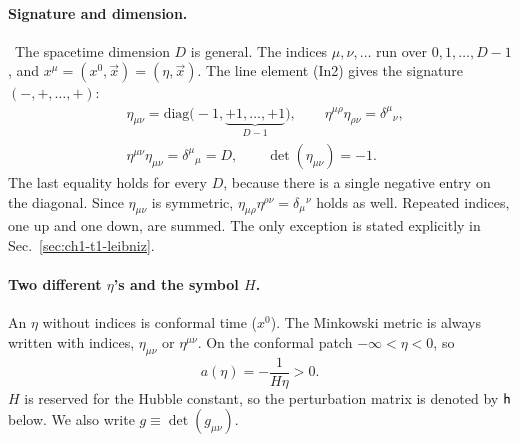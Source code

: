 \paragraph{Signature and dimension.} \tA\ The spacetime dimension $D$ is
general. The indices $\mu,\nu,\ldots$ run over $0,1,\ldots,D-1$, and
$x^\mu=(x^0,\vec x)=(\eta,\vec x)$. The line element (In2) gives the
signature $(-,+,\ldots,+)$:
\begin{equation}
\begin{aligned}
&\eta_{\mu\nu}=\mathrm{diag}\big(-1,\underbrace{+1,\ldots,+1}_{D-1}\big),\qquad
\eta^{\mu\rho}\eta_{\rho\nu}=\delta^\mu{}_\nu,\\
&\eta^{\mu\nu}\eta_{\mu\nu}=\delta^\mu{}_\mu=D,\qquad
\det(\eta_{\mu\nu})=-1 .
\end{aligned}
\label{eq:ch1-eta}
\end{equation}
The last equality holds for every $D$, because there is a single negative entry
on the diagonal. Since $\eta_{\mu\nu}$ is symmetric,
$\eta_{\mu\rho}\eta^{\rho\nu}=\delta_\mu{}^\nu$ holds as well. Repeated indices,
one up and one down, are summed. The only exception is stated explicitly in
Sec.~\ref{sec:ch1-t1-leibniz}.

\paragraph{Two different $\eta$'s and the symbol $H$.} An $\eta$ without
indices is conformal time ($x^0$). The Minkowski metric is always written with
indices, $\eta_{\mu\nu}$ or $\eta^{\mu\nu}$. On the conformal patch
$-\infty<\eta<0$, so
\begin{equation}
a(\eta)=-\frac{1}{H\eta}>0 .
\label{eq:ch1-apos}
\end{equation}
$H$ is reserved for the Hubble constant, so the perturbation matrix is denoted
by $\mathsf{h}$ below. We also write $g\equiv\det(g_{\mu\nu})$.

